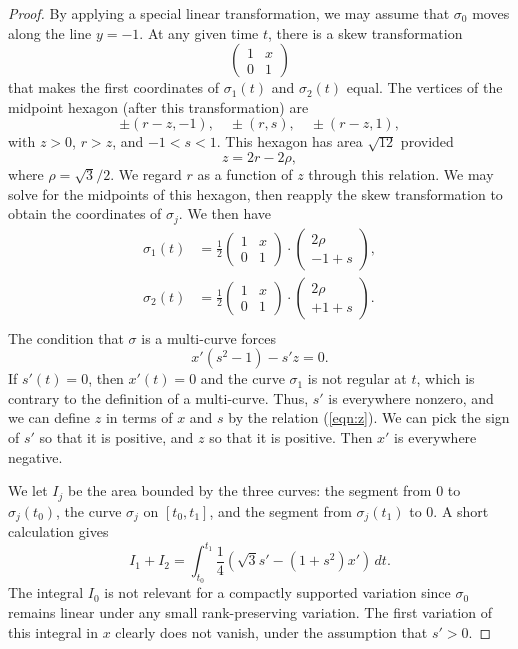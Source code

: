 \documentclass[11pt]{amsart}
\begin{document}
\begin{proof} By applying a special linear transformation, we may
  assume that $\sigma_0$ moves along the line $y=-1$.  At any given
  time $t$, there is a skew transformation
  \def\xm{\left(\begin{matrix} 1& x\\0&1\end{matrix}\right)}
  \def\vc#1#2{\left(\begin{matrix}#1\\#2\end{matrix}\right)}
$$
\xm
$$
that makes the first coordinates of $\sigma_1(t)$ and $\sigma_2(t)$
equal.  The vertices of the midpoint hexagon (after this
transformation) are
$$
\pm (r-z,-1), \quad \pm (r,s),\quad \pm (r-z,1),
$$
with $z>0$, $r>z$, and $-1<s<1$.  This hexagon has area $\sqrt{12}$ provided
$$
z = 2 r - 2 \rho,
$$
where $\rho = \sqrt3/2$.  We regard $r$ as a function of $z$ through
this relation.  We may solve for the midpoints of this hexagon, then
reapply the skew transformation to obtain the coordinates of
$\sigma_j$.  We then have
$$
\begin{array}{lll}
\sigma_1(t) &= \frac12\xm\cdot\vc {2\rho}{-1+s},\\
\sigma_2(t) &= \frac12\xm\cdot\vc {2\rho}{+1+s}.\\
\end{array}
$$
The condition that $\sigma$ is a multi-curve forces
\begin{equation}\label{eqn:z}
x' (s^2 - 1) - s' z = 0.
\end{equation}
If $s'(t)=0$, then $x'(t)=0$ and the curve $\sigma_1$ is not regular
at $t$, which is contrary to the definition of a multi-curve.  Thus,
$s'$ is everywhere nonzero, and we can define $z$ in terms of $x$ and
$s$ by the relation (\ref{eqn:z}).  We can pick the sign of $s'$ so
that it is positive, and $z$ so that it is positive.  Then $x'$ is
everywhere negative.

We let $I_j$ be the area bounded by the three curves: the segment from
$0$ to $\sigma_j(t_0)$, the curve $\sigma_j$ on $[t_0,t_1]$, and the
segment from $\sigma_j(t_1)$ to $0$.  A short calculation gives
$$
I_1 + I_2 = \int_{t_0}^{t_1} \frac{1}4 (\sqrt{3} s' - (1+s^2) x')\,dt.
$$
The integral $I_0$ is not relevant for a compactly supported variation
since $\sigma_0$ remains linear under any small rank-preserving
variation.  The first variation of this integral in $x$ clearly does
not vanish, under the assumption that $s'>0$.
\end{proof}
\end{document}
